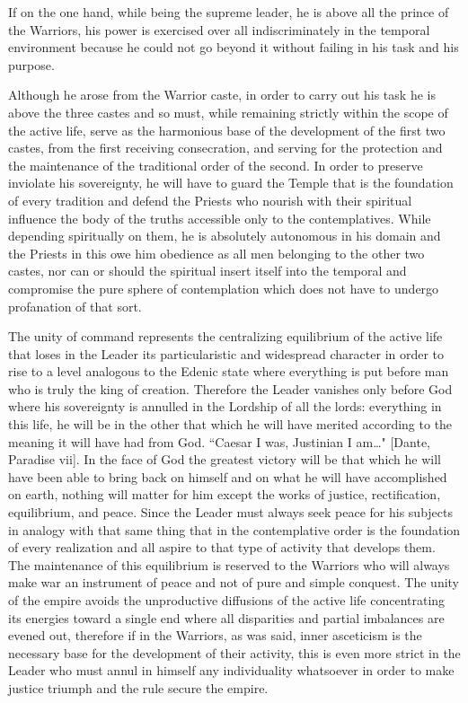 If on the one hand, while being the supreme leader, he is above all the prince of the Warriors, his power is exercised over all indiscriminately in the temporal environment because he could not go beyond it without failing in his task and his purpose.

Although he arose from the Warrior caste, in order to carry out his task he is above the three castes and so must, while remaining strictly within the scope of the active life, serve as the harmonious base of the development of the first two castes, from the first receiving consecration, and serving for the protection and the maintenance of the traditional order of the second. In order to preserve inviolate his sovereignty, he will have to guard the Temple that is the foundation of every tradition and defend the Priests who nourish with their spiritual influence the body of the truths accessible only to the contemplatives. While depending spiritually on them, he is absolutely autonomous in his domain and the Priests in this owe him obedience as all men belonging to the other two castes, nor can or should the spiritual insert itself into the temporal and compromise the pure sphere of contemplation which does not have to undergo profanation of that sort.

The unity of command represents the centralizing equilibrium of the active life that loses in the Leader its particularistic and widespread character in order to rise to a level analogous to the Edenic state where everything is put before man who is truly the king of creation. Therefore the Leader vanishes only before God where his sovereignty is annulled in the Lordship of all the lords: everything in this life, he will be in the other that which he will have merited according to the meaning it will have had from God. ``Caesar I was, Justinian I am…" [Dante, Paradise vii]. In the face of God the greatest victory will be that which he will have been able to bring back on himself and on what he will have accomplished on earth, nothing will matter for him except the works of justice, rectification, equilibrium, and peace. Since the Leader must always seek peace for his subjects in analogy with that same thing that in the contemplative order is the foundation of every realization and all aspire to that type of activity that develops them. The maintenance of this equilibrium is reserved to the Warriors who will always make war an instrument of peace and not of pure and simple conquest. The unity of the empire avoids the unproductive diffusions of the active life concentrating its energies toward a single end where all disparities and partial imbalances are evened out, therefore if in the Warriors, as was said, inner asceticism is the necessary base for the development of their activity, this is even more strict in the Leader who must annul in himself any individuality whatsoever in order to make justice triumph and the rule secure the empire.

